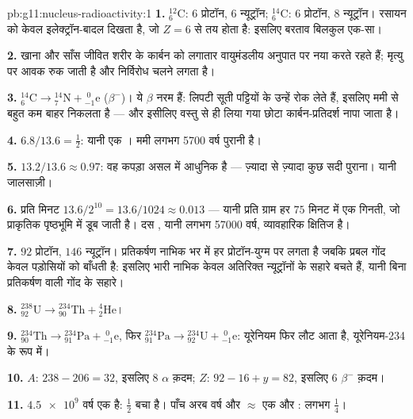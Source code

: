 \begin{solution}{pb:g11:nucleus-radioactivity:1}
\textbf{1.} ${}^{12}_{6}\mathrm{C}$: $6$ प्रोटॉन, $6$ न्यूट्रॉन; ${}^{14}_{6}\mathrm{C}$: $6$
प्रोटॉन, $8$ न्यूट्रॉन। रसायन को केवल इलेक्ट्रॉन-बादल दिखता है, जो
$Z = 6$ से तय होता है: इसलिए बरताव बिलकुल एक-सा।

\textbf{2.} खाना और साँस जीवित शरीर के कार्बन को लगातार वायुमंडलीय अनुपात पर
नया करते रहते हैं; मृत्यु पर आवक रुक जाती है और  निर्विरोध चलने लगता है।

\textbf{3.} ${}^{14}_{6}\mathrm{C} \to {}^{14}_{7}\mathrm{N} +
{}^{\;0}_{-1}\mathrm{e}$ ($\beta^-$)। ये $\beta$ नरम हैं: लिपटी सूती पट्टियों के
 उन्हें रोक लेते हैं, इसलिए ममी से बहुत कम बाहर निकलता है ---
और इसीलिए वस्तु से ही लिया गया छोटा कार्बन-प्रतिदर्श नापा जाता है।

\textbf{4.} $6.8/13.6 = \frac12$: यानी एक । ममी लगभग \num{5700} वर्ष पुरानी
है।

\textbf{5.} $13.2/13.6 \approx 0.97$: वह कपड़ा असल में आधुनिक है --- ज़्यादा से ज़्यादा कुछ
सदी पुराना। यानी जालसाज़ी।

\textbf{6.} प्रति मिनट $13.6/2^{10} = 13.6/1024 \approx 0.013$  --- यानी प्रति ग्राम हर $75$ मिनट में
एक गिनती, जो प्राकृतिक पृष्ठभूमि में डूब जाती है। दस , यानी लगभग
\num{57000} वर्ष, व्यावहारिक क्षितिज है।

\textbf{7.} $92$ प्रोटॉन, $146$ न्यूट्रॉन।  प्रतिकर्षण
नाभिक भर में हर प्रोटॉन-युग्म पर लगता है जबकि प्रबल गोंद केवल
पड़ोसियों को बाँधती है: इसलिए भारी नाभिक केवल अतिरिक्त न्यूट्रॉनों के सहारे
बचते हैं, यानी बिना प्रतिकर्षण वाली गोंद के सहारे।

\textbf{8.} ${}^{238}_{92}\mathrm{U} \to {}^{234}_{90}\mathrm{Th} +
{}^{4}_{2}\mathrm{He}$।

\textbf{9.} ${}^{234}_{90}\mathrm{Th} \to {}^{234}_{91}\mathrm{Pa} +
{}^{\;0}_{-1}\mathrm{e}$, फिर ${}^{234}_{91}\mathrm{Pa} \to
{}^{234}_{92}\mathrm{U} + {}^{\;0}_{-1}\mathrm{e}$: यूरेनियम फिर लौट आता है, यूरेनियम-234 के
रूप में।

\textbf{10.} $A$: $238 - 206 = 32$, इसलिए $8$ $\alpha$ क़दम; $Z$: $92 - 16 + y = 82$,
इसलिए $6$ $\beta^-$ क़दम।

\textbf{11.} $\num{4.5e9}$ वर्ष एक  है: $\frac12$ बचा है। पाँच अरब
वर्ष और $\approx$ एक और : लगभग $\frac14$।


\end{solution}
